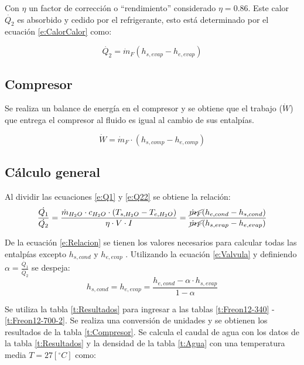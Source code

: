 \documentclass[11pt,letterpaper]{extarticle}        %
\numberwithin{equation}{section}                    %
\newcommand{\grados}{^{\circ}}                      %
\newcommand{\quotes}[1]{``#1''}                     %
\begin{document}
Con $\eta$ un factor de corrección o \quotes{rendimiento} considerado $\eta = 0.86$.
Este calor $\dot{Q_2}$ es absorbido y cedido por el refrigerante, esto está determinado por el ecuación \ref{e:CalorCalor} como:

\begin{equation}
\label{e:Q22}
\dot{Q_2} = \dot{m}_F (h_{s,evap} - h_{e,evap})
\end{equation}

\subsection{Compresor}
Se realiza un balance de energía en el compresor y se obtiene que el trabajo ($\dot{W}$) que entrega el compresor al fluido es igual al cambio de sus entalpías.

\begin{equation}
\label{e:Compresor}
\dot{W} = \dot{m}_F \cdot (h_{s,comp}-h_{e,comp}) 
\end{equation}

\subsection{Cálculo general}
Al dividir las ecuaciones \ref{e:Q1} y \ref{e:Q22} se obtiene la relación:
\begin{equation}
\label{e:Relacion}
\frac{\dot{Q_1}}{\dot{Q_2}} =
\frac{\dot{m}_{H_2O} \cdot c_{H_2O} \cdot (T_{s,H_2O}-T_{e,H_2O})}{\eta \cdot V \cdot I} = 
\frac{\cancel{\dot{m}_F} (h_{e,cond} - h_{s,cond})}{\cancel{\dot{m}_F} (h_{s,evap} - h_{e,evap})} 
\end{equation}

De la ecuación \ref{e:Relacion} se tienen los valores necesarios para calcular todas las entalpías excepto $h_{s,cond}$ y $h_{e,evap}$ . Utilizando la ecuación \ref{e:Valvula} y definiendo $\alpha = \frac{\dot{Q_1}}{\dot{Q_2}}$ se despeja:
\begin{equation}
\label{e:Hbuscada}
h_{s,cond} = h_{e,evap} =
\frac{h_{e,cond}-\alpha \cdot h_{s,evap}}{1-\alpha}
\end{equation}

Se utiliza la tabla \ref{t:Resultados} para ingresar a las tablas \ref{t:Freon12-340} - \ref{t:Freon12-700-2}. Se realiza una conversión de unidades y se obtienen los resultados de la tabla \ref{t:Compresor}. Se calcula el caudal de agua con los datos de la tabla \ref{t:Resultados} y la densidad de la tabla \ref{t:Agua} con una temperatura media $T=27[\grados C]$ como:
\end{document}
